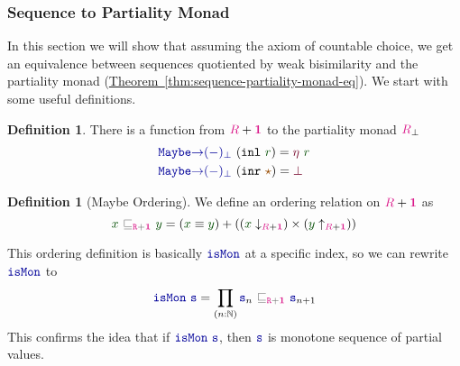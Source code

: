 \documentclass[twoside,11pt,openright]{report}
\theoremstyle{plain} %
\theoremstyle{definition}
\newtheorem{defn}[thm]{Definition}%
\theoremstyle{remark}
\newcommand*{\thmref}[1]{\hyperref[thm:#1]{Theorem~\ref*{thm:#1}}} %
\newcommand*{\term}[1]{\textcolor{green!30!black}{#1}} %
\newcommand*{\type}[1]{\textcolor{magenta!90!black}{#1}}
\newcommand*{\unit}{\type{\textbf{1}}}
\newcommand*{\relation}[1]{\textcolor{gray!75!black}{\ensuremath{\mathtt{#1}}}}
\newcommand*{\constant}[1]{\textcolor{orange!60!black}{\ensuremath{\mathtt{#1}}}}
\newcommand*{\function}[1]{\textcolor{blue!60!black}{\ensuremath{\mathtt{#1}}}}
\newcommand*{\constructor}[1]{\textcolor{purple!60!black}{\ensuremath{\mathtt{#1}}}}
\newcommand*{\unitelem}{\constant{\star}} %
\begin{document}
\subsubsection{Sequence to Partiality Monad}
\label{sec:sequences-to-partiality-monad}
In this section we will show that assuming the axiom of countable choice, we get an equivalence between sequences quotiented by weak bisimilarity and the partiality monad (\thmref{sequence-partiality-monad-eq}). We start with some useful definitions.
\begin{defn} There is a function from \(\type{R} + \unit\) to the partiality monad \(\type{R}_\bot\)
  \begin{equation}
    \begin{aligned}
      &\function{Maybe{\rightarrow}(-)_\bot}~(\mathtt{inl}~\term{r}) = \constructor{\eta}~\term{r} \\
      &\function{Maybe{\rightarrow}(-)_\bot}~(\mathtt{inr}~\unitelem) = \constructor{\bot}
    \end{aligned}
  \end{equation}
\end{defn}
\begin{defn}[Maybe Ordering]
  \label{eq:maybe-order}
  We define an ordering relation on \(\type{R} + \unit\) as 
  \begin{equation}
    \term{x}~\relation{\sqsubseteq_{\type{R} + \unit}}~\term{y} = (\term{x} \equiv \term{y}) + ((\term{x}  \downarrow_{\type{R} + \unit}) \times (\term{y} \uparrow_{\type{R} + \unit}))
  \end{equation}
\end{defn}
\noindent This ordering definition is basically \(\function{isMon}\) at a specific index, so we can rewrite \(\function{isMon}\) to
\begin{equation}
  \function{isMon}~\function{s} = \prod_{(n : \mathbb{N})} \function{s}_n~\relation{\sqsubseteq_{\type{R} + \unit}}~\function{s}_{n+1}
\end{equation}
This confirms the idea that if \(\function{isMon}~\function{s}\), then \(\function{s}\) is monotone sequence of partial values.
\end{document}
